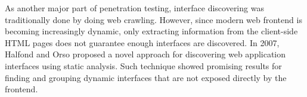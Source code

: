As another major part of penetration testing, interface discovering was traditionally done by doing web crawling. However, since modern web frontend is becoming increasingly dynamic, only extracting information from the client-side HTML pages does not guarantee enough interfaces are discovered. In 2007, Halfond and Orso \cite{ref2} proposed a novel approach for discovering web application interfaces using static analysis. Such technique showed promising results for finding and grouping dynamic interfaces that are not exposed directly by the frontend.



